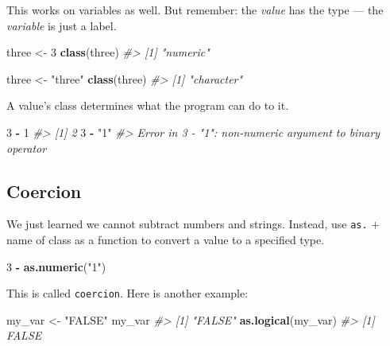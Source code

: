 \documentclass[]{book}
\newenvironment{Shaded}{\begin{snugshade}}{\end{snugshade}}
\newcommand{\KeywordTok}[1]{\textcolor[rgb]{0.13,0.29,0.53}{\textbf{#1}}}
\newcommand{\DecValTok}[1]{\textcolor[rgb]{0.00,0.00,0.81}{#1}}
\newcommand{\StringTok}[1]{\textcolor[rgb]{0.31,0.60,0.02}{#1}}
\newcommand{\CommentTok}[1]{\textcolor[rgb]{0.56,0.35,0.01}{\textit{#1}}}
\newcommand{\OperatorTok}[1]{\textcolor[rgb]{0.81,0.36,0.00}{\textbf{#1}}}
\newcommand{\NormalTok}[1]{#1}
\begin{document}
This works on variables as well. But remember: the \emph{value} has the
type --- the \emph{variable} is just a label.

\begin{Shaded}
\begin{Highlighting}[]
\NormalTok{three <-}\StringTok{ }\DecValTok{3}
\KeywordTok{class}\NormalTok{(three)}
\CommentTok{#> [1] "numeric"}

\NormalTok{three <-}\StringTok{ "three"}
\KeywordTok{class}\NormalTok{(three)}
\CommentTok{#> [1] "character"}
\end{Highlighting}
\end{Shaded}

A value's class determines what the program can do to it.

\begin{Shaded}
\begin{Highlighting}[]
\DecValTok{3} \OperatorTok{-}\StringTok{ }\DecValTok{1}
\CommentTok{#> [1] 2}
\DecValTok{3} \OperatorTok{-}\StringTok{ "1"}
\CommentTok{#> Error in 3 - "1": non-numeric argument to binary operator}
\end{Highlighting}
\end{Shaded}

\subsection{Coercion}\label{coercion}

We just learned we cannot subtract numbers and strings. Instead, use
\texttt{as.} + name of class as a function to convert a value to a
specified type.

\begin{Shaded}
\begin{Highlighting}[]
\DecValTok{3} \OperatorTok{-}\StringTok{ }\KeywordTok{as.numeric}\NormalTok{(}\StringTok{"1"}\NormalTok{)}
\end{Highlighting}
\end{Shaded}

This is called \texttt{coercion}. Here is another example:

\begin{Shaded}
\begin{Highlighting}[]
\NormalTok{my_var <-}\StringTok{ "FALSE"}
\NormalTok{my_var}
\CommentTok{#> [1] "FALSE"}
\KeywordTok{as.logical}\NormalTok{(my_var)}
\CommentTok{#> [1] FALSE}
\end{Highlighting}
\end{Shaded}
\end{document}
